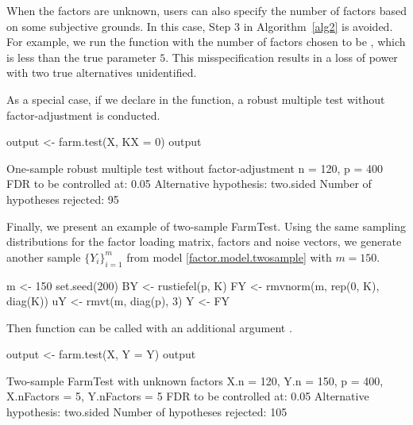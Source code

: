 
When the factors are unknown, users can also specify the number of factors based on some subjective grounds. In this case,  Step 3 in Algorithm~\ref{alg2} is avoided.
For example, we run the function with the number of factors chosen to be , which is less than the true parameter $5$. This misspecification results in a loss of power with two true alternatives unidentified.




As a special case, if we declare  in the function, a robust multiple test without factor-adjustment is conducted.


\begin{example*}
output <- farm.test(X, KX = 0)
output

One-sample robust multiple test without factor-adjustment
n = 120, p = 400
FDR to be controlled at: 0.05
Alternative hypothesis: two.sided
Number of hypotheses rejected: 95
\end{example*}




Finally, we present an example of two-sample FarmTest. Using the same sampling distributions for the factor loading matrix, factors and noise vectors, we generate another sample $\{Y_i\}_{i = 1}^{m}$ from model \eqref{factor.model.twosample} with $m = 150$.

\begin{example*}
m <- 150
set.seed(200)
BY <- rustiefel(p, K) %
FY <- rmvnorm(m, rep(0, K), diag(K))
uY <- rmvt(m, diag(p), 3)
Y <- FY %
\end{example*}

Then  function can be called with an additional argument .


\begin{example*}
output <- farm.test(X, Y = Y)
output

Two-sample FarmTest with unknown factors
X.n = 120, Y.n = 150, p = 400, X.nFactors = 5, Y.nFactors = 5
FDR to be controlled at: 0.05
Alternative hypothesis: two.sided
Number of hypotheses rejected: 105
\end{example*}


